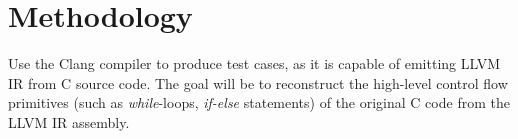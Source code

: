 
\section{Methodology}

Use the Clang compiler to produce test cases, as it is capable of emitting LLVM IR from C source code. The goal will be to reconstruct the high-level control flow primitives (such as \textit{while}-loops, \textit{if-else} statements) of the original C code from the LLVM IR assembly.




